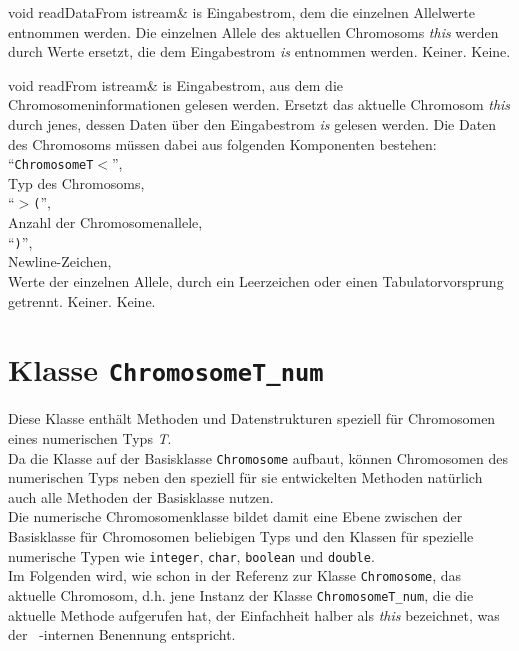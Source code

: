 \documentclass{report}
\begin{document}
\vspace{4ex}

    \setNormalInstance
    \printMethodWithOneParam
    {void} 
    {readDataFrom}
    {istream\&} 
    {is} 
    {Eingabestrom, dem die einzelnen 
    Allelwerte entnommen werden.}
    {Die einzelnen Allele des aktuellen Chromosoms {\em this} werden durch Werte
    ersetzt, die dem Eingabestrom {\em is} entnommen werden.}
    {Keiner.}
    {Keine.}

\newpage

    \setNormalInstance
    \printMethodWithOneParam
    {void}
    {readFrom}
    {istream\&} 
    {is}
    {Eingabestrom, aus dem die Chromosomeninformationen gelesen werden.}
    {Ersetzt das aktuelle Chromosom {\em this} durch jenes, dessen Daten 
     \"uber den Eingabestrom {\em is} gelesen werden. Die Daten des 
     Chromosoms m\"ussen dabei aus folgenden Komponenten bestehen:\\
     ``{\tt ChromosomeT$<$}'',\\
     Typ des Chromosoms,\\ 
     ``{\tt $>$(}'',\\
     Anzahl der Chromosomenallele,\\ 
     ``{\tt )}'',\\ 
     Newline-Zeichen,\\
     Werte der einzelnen Allele, durch ein Leerzeichen oder einen 
     Tabulatorvorsprung getrennt.}
    {Keiner.}
    {Keine.}

\newpage

\setNormalInstance

\chapter{Klasse {\tt ChromosomeT\_num}}
Diese Klasse enth\"alt Methoden und Datenstrukturen speziell
f\"ur Chromosomen eines numerischen Typs {\sl T}.\\
Da die Klasse auf der Basisklasse {\tt Chromosome} aufbaut, k\"onnen
Chromosomen des numerischen Typs neben den speziell f\"ur sie
entwickelten Methoden nat\"urlich auch alle Methoden der
Basisklasse nutzen.\\
Die numerische Chromosomenklasse bildet damit eine Ebene zwischen
der Basisklasse f\"ur Chromosomen beliebigen Typs und den Klassen f\"ur
spezielle numerische Typen wie {\tt integer}, {\tt char}, {\tt boolean}
und {\tt double}.\\
Im Folgenden wird, wie schon in der Referenz zur Klasse {\tt Chromosome}, 
das aktuelle Chromosom, d.h. jene Instanz der Klasse
{\tt ChromosomeT\_num}, die die aktuelle Methode aufgerufen hat, der 
Einfachheit halber als {\em this} bezeichnet, was der \cpp\ -internen 
Benennung entspricht.
\end{document}
